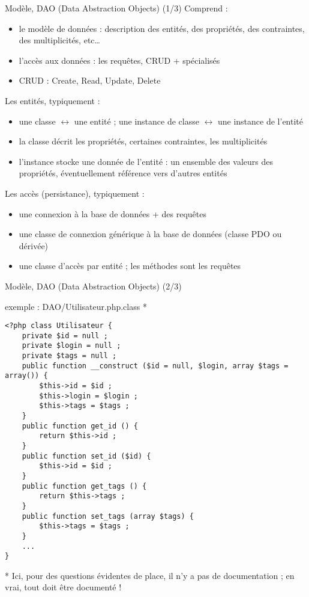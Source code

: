 \begin{frame}[containsverbatim]{Modèle, DAO (Data Abstraction Objects) (1/3)}
	Comprend :	
	\begin{itemize}
		\item le modèle de données : description des entités, des propriétés, des contraintes, des multiplicités, etc\ldots
		\item l'accès aux données : les requêtes, CRUD + spécialisés
		\item CRUD : Create, Read, Update, Delete
	\end{itemize}
	Les entités, typiquement :	
	\begin{itemize}
		\item une classe $\leftrightarrow$ une entité ; une instance de classe $\leftrightarrow$ une instance de l'entité
		\item la classe décrit les propriétés, certaines contraintes, les multiplicités
		\item l'instance stocke une donnée de l'entité : un ensemble des valeurs des propriétés, éventuellement référence vers d'autres entités
	\end{itemize}
	Les accès (persistance), typiquement :	
	\begin{itemize}
		\item une connexion à la base de données + des requêtes
		\item une classe de connexion générique à la base de données (classe PDO ou dérivée)
		\item une classe d'accès par entité ; les méthodes sont les requêtes
	\end{itemize}
\end{frame}

\begin{frame}[containsverbatim]{Modèle, DAO (Data Abstraction Objects) (2/3)}
	\begin{block}{exemple : DAO/Utilisateur.php.class *}
		\begin{lstlisting}
<?php class Utilisateur {
	private $id = null ;
	private $login = null ;
	private $tags = null ;
	public function __construct ($id = null, $login, array $tags = array()) {
		$this->id = $id ;
		$this->login = $login ;
		$this->tags = $tags ;
	}
	public function get_id () { 
		return $this->id ; 
	}
	public function set_id ($id) { 
		$this->id = $id ; 
	}
	public function get_tags () { 
		return $this->tags ; 
	}
	public function set_tags (array $tags) { 
		$this->tags = $tags ; 
	}
	...
}
		\end{lstlisting}
	\end{block}
	* Ici, pour des questions évidentes de place, il n'y a pas de documentation ; en vrai, tout doit être documenté !
\end{frame}

